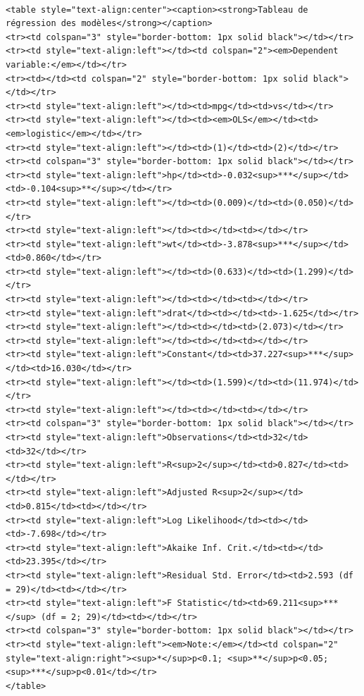 \documentclass[
  letterpaper,
  DIV=11,
  numbers=noendperiod]{scrreprt}
\begin{document}
\begin{verbatim}

<table style="text-align:center"><caption><strong>Tableau de régression des modèles</strong></caption>
<tr><td colspan="3" style="border-bottom: 1px solid black"></td></tr><tr><td style="text-align:left"></td><td colspan="2"><em>Dependent variable:</em></td></tr>
<tr><td></td><td colspan="2" style="border-bottom: 1px solid black"></td></tr>
<tr><td style="text-align:left"></td><td>mpg</td><td>vs</td></tr>
<tr><td style="text-align:left"></td><td><em>OLS</em></td><td><em>logistic</em></td></tr>
<tr><td style="text-align:left"></td><td>(1)</td><td>(2)</td></tr>
<tr><td colspan="3" style="border-bottom: 1px solid black"></td></tr><tr><td style="text-align:left">hp</td><td>-0.032<sup>***</sup></td><td>-0.104<sup>**</sup></td></tr>
<tr><td style="text-align:left"></td><td>(0.009)</td><td>(0.050)</td></tr>
<tr><td style="text-align:left"></td><td></td><td></td></tr>
<tr><td style="text-align:left">wt</td><td>-3.878<sup>***</sup></td><td>0.860</td></tr>
<tr><td style="text-align:left"></td><td>(0.633)</td><td>(1.299)</td></tr>
<tr><td style="text-align:left"></td><td></td><td></td></tr>
<tr><td style="text-align:left">drat</td><td></td><td>-1.625</td></tr>
<tr><td style="text-align:left"></td><td></td><td>(2.073)</td></tr>
<tr><td style="text-align:left"></td><td></td><td></td></tr>
<tr><td style="text-align:left">Constant</td><td>37.227<sup>***</sup></td><td>16.030</td></tr>
<tr><td style="text-align:left"></td><td>(1.599)</td><td>(11.974)</td></tr>
<tr><td style="text-align:left"></td><td></td><td></td></tr>
<tr><td colspan="3" style="border-bottom: 1px solid black"></td></tr><tr><td style="text-align:left">Observations</td><td>32</td><td>32</td></tr>
<tr><td style="text-align:left">R<sup>2</sup></td><td>0.827</td><td></td></tr>
<tr><td style="text-align:left">Adjusted R<sup>2</sup></td><td>0.815</td><td></td></tr>
<tr><td style="text-align:left">Log Likelihood</td><td></td><td>-7.698</td></tr>
<tr><td style="text-align:left">Akaike Inf. Crit.</td><td></td><td>23.395</td></tr>
<tr><td style="text-align:left">Residual Std. Error</td><td>2.593 (df = 29)</td><td></td></tr>
<tr><td style="text-align:left">F Statistic</td><td>69.211<sup>***</sup> (df = 2; 29)</td><td></td></tr>
<tr><td colspan="3" style="border-bottom: 1px solid black"></td></tr><tr><td style="text-align:left"><em>Note:</em></td><td colspan="2" style="text-align:right"><sup>*</sup>p<0.1; <sup>**</sup>p<0.05; <sup>***</sup>p<0.01</td></tr>
</table>
\end{verbatim}
\end{document}
